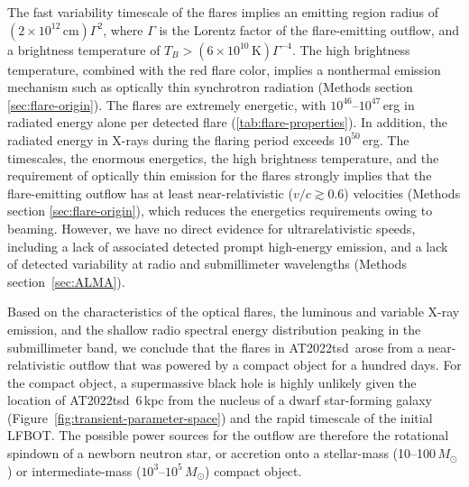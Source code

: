 \documentclass{nature_plusfigure}
\newcommand{\at}{AT2022tsd}
\begin{document}
The fast variability timescale of the flares implies an emitting region radius of $(2\times10^{12}\,\mathrm{cm}) \Gamma^2$, where $\Gamma$ is the Lorentz factor of the flare-emitting outflow,
and a brightness temperature of $T_B>(6\times10^{10}\,\mathrm{K})\Gamma^{-4}$.
The high brightness temperature, combined with the red flare color, implies a nonthermal emission mechanism such as optically thin synchrotron radiation (Methods section \ref{sec:flare-origin}).
The flares are extremely energetic, with $10^{46}$--$10^{47}$\,erg in radiated energy alone per detected flare (\ref{tab:flare-properties}).
In addition, the radiated energy in X-rays during the flaring period exceeds $10^{50}$\,erg.
The timescales, the enormous energetics, the high brightness temperature, and the requirement of optically thin emission for the flares strongly implies that the flare-emitting outflow has at least near-relativistic ($v/c\gtrsim0.6$) velocities (Methods section \ref{sec:flare-origin}),
which reduces the energetics requirements owing to beaming.
However, we have no direct evidence for ultrarelativistic speeds, including a lack of associated detected prompt high-energy emission,
and a lack of detected variability at radio and submillimeter wavelengths (Methods section~\ref{sec:ALMA}).

Based on the characteristics of the optical flares, the luminous and variable X-ray emission, and the shallow radio spectral energy distribution peaking in the submillimeter band, we conclude that the flares in \at\ arose from a near-relativistic outflow that was powered by a compact object for a hundred days. For the compact object, a supermassive black hole is highly unlikely given the location of \at\ 6\,kpc from the nucleus of a dwarf star-forming galaxy (Figure~\ref{fig:transient-parameter-space}) and the rapid timescale of the initial LFBOT. The possible power sources for the outflow are therefore the rotational spindown of a newborn neutron star, or accretion onto a stellar-mass (10--100\,$M_\odot$) or intermediate-mass ($10^{3}$--$10^{5}\,M_\odot$) compact object.

\end{document}
